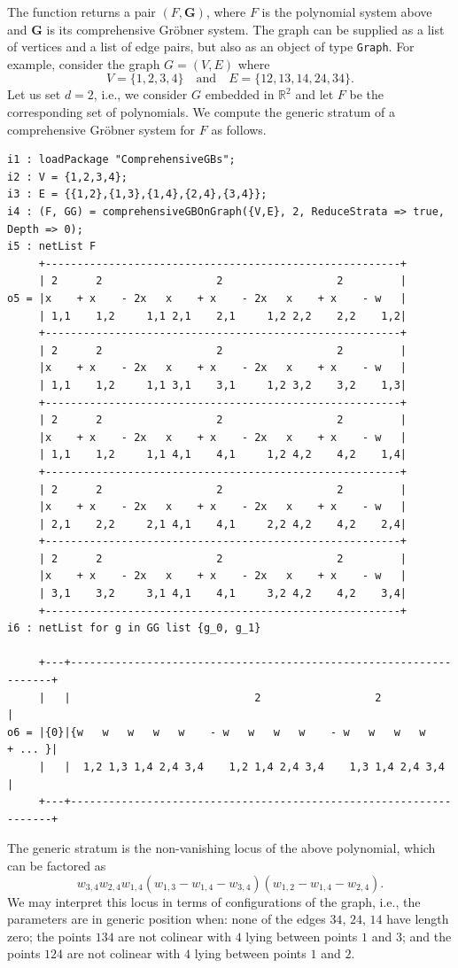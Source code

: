 \documentclass[11pt]{amsart}
\theoremstyle{plain}
\theoremstyle{definition}
\theoremstyle{remark}
\newcommand{\RR}{\mathbb R}
\begin{document}
The function returns a pair $(F, \mathbf G)$,
where $F$ is the polynomial system above and $\mathbf G$
is its comprehensive Gr\"obner system.
The graph can be supplied as a list of vertices
and a list of edge pairs, but also as an object
of type \texttt{Graph}. 
For example, consider the graph $G = (V, E)$ where
\[
V = \{1,2,3,4\} 
\quad \text{and} \quad
E = \{12, 13, 14, 24, 34\}.
\]
Let us set $d = 2$, i.e., we consider $G$ embedded in $\RR^2$ and let $F$ be the corresponding set of polynomials. We compute the generic stratum of a comprehensive Gr\"obner system for $F$ as follows.
\begin{lstlisting}
i1 : loadPackage "ComprehensiveGBs";
i2 : V = {1,2,3,4};
i3 : E = {{1,2},{1,3},{1,4},{2,4},{3,4}};
i4 : (F, GG) = comprehensiveGBOnGraph({V,E}, 2, ReduceStrata => true, Depth => 0);
i5 : netList F
     +--------------------------------------------------------+
     | 2      2                  2                  2         |
o5 = |x    + x    - 2x   x    + x    - 2x   x    + x    - w   |
     | 1,1    1,2     1,1 2,1    2,1     1,2 2,2    2,2    1,2|
     +--------------------------------------------------------+
     | 2      2                  2                  2         |
     |x    + x    - 2x   x    + x    - 2x   x    + x    - w   |
     | 1,1    1,2     1,1 3,1    3,1     1,2 3,2    3,2    1,3|
     +--------------------------------------------------------+
     | 2      2                  2                  2         |
     |x    + x    - 2x   x    + x    - 2x   x    + x    - w   |
     | 1,1    1,2     1,1 4,1    4,1     1,2 4,2    4,2    1,4|
     +--------------------------------------------------------+
     | 2      2                  2                  2         |
     |x    + x    - 2x   x    + x    - 2x   x    + x    - w   |
     | 2,1    2,2     2,1 4,1    4,1     2,2 4,2    4,2    2,4|
     +--------------------------------------------------------+
     | 2      2                  2                  2         |
     |x    + x    - 2x   x    + x    - 2x   x    + x    - w   |
     | 3,1    3,2     3,1 4,1    4,1     3,2 4,2    4,2    3,4|
     +--------------------------------------------------------+
i6 : netList for g in GG list {g_0, g_1}

     +---+-------------------------------------------------------------------+
     |   |                             2                  2                  |
o6 = |{0}|{w   w   w   w   w    - w   w   w   w    - w   w   w   w    + ... }|
     |   |  1,2 1,3 1,4 2,4 3,4    1,2 1,4 2,4 3,4    1,3 1,4 2,4 3,4        |
     +---+-------------------------------------------------------------------+
\end{lstlisting}
The generic stratum is the non-vanishing locus of the above polynomial, which can be factored as
\[
w_{3,4} w_{2,4} w_{1,4} (w_{1,3} - w_{1,4} - w_{3,4})(w_{1,2} - w_{1,4} - w_{2,4}).
\]
We may interpret this locus in terms of configurations of the graph, i.e., the parameters are in generic position when: none of the edges $34$, $24$, $14$ have length zero; the points $134$ are not colinear with $4$ lying between points $1$ and $3$; and the points $124$ are not colinear with $4$ lying between points $1$ and $2$.
\end{document}
